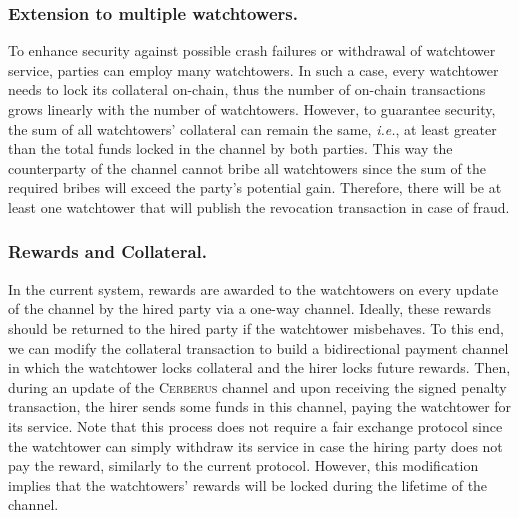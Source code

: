 \documentclass[twocolumn,showpacs,%
  nofootinbib,aps,superscriptaddress,%
  eqsecnum,prd,notitlepage,showkeys,10pt]{revtex4-1}
\newcommand{\ie}{{\em i.e.}}
\newcommand{\sys}{\textsc{Cerberus}\xspace}
\begin{document}
\subsubsection*{Extension to multiple watchtowers.}
To enhance security against possible crash failures or withdrawal of watchtower service, parties can employ many watchtowers. In such a case, every watchtower needs to lock its collateral on-chain, thus the number of on-chain transactions grows linearly with the number of watchtowers. However, to guarantee security, the sum of all watchtowers' collateral can remain the same, \ie, at least greater than the total funds locked in the channel by both parties. This way the counterparty of the channel cannot bribe all watchtowers since the sum of the required bribes will exceed the party's potential gain. Therefore, there will be at least one watchtower that will publish the revocation transaction in case of fraud.

\subsubsection*{Rewards and Collateral.}
In the current system, rewards are awarded to the watchtowers on every update of the channel by the hired party via a one-way channel. Ideally, these rewards should be returned to the hired party if the watchtower misbehaves. To this end, we can modify the collateral transaction to build a bidirectional payment channel in which the watchtower locks collateral and the hirer locks future rewards. Then, during an update of the \sys channel and upon receiving the signed penalty transaction, the hirer sends some funds in this channel, paying the watchtower for its service. Note that this process does not require a fair exchange protocol since the watchtower can simply withdraw its service in case the hiring party does not pay the reward, similarly to the current protocol. However, this modification implies that the watchtowers' rewards will be locked during the lifetime of the channel.

\end{document}

